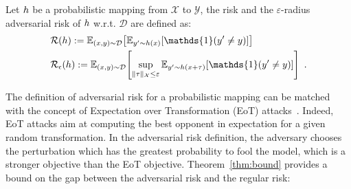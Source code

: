\begin{definition}
 Let $h$ be a probabilistic mapping from $\mathcal{X}$ to $\mathcal{Y}$, the risk and the $\varepsilon$-radius adversarial risk of $h$ w.r.t. $\mathcal{D}$ are defined as:
 \begin{align*}
&\risk(\probmap):= \mathbb{E}_{(x,y)\sim \mathcal{D}}\left[ \mathbb{E}_{y'\sim \probmap(x)} \left[ \mathds{1} \left( y' \neq y \right)\right]\right]\\
&\riskadv(\probmap):= \mathbb{E}_{(x,y)\sim \mathcal{D}}\left[ \sup_{\lVert{\tau}\rVert_{\mathcal{X}} \leq \varepsilon}\mathbb{E}_{y'\sim \probmap(x+\tau)} \left[ \mathds{1} \left( y' \neq y \right)\right]\right]\enspace.
\end{align*}




    
    
    

\end{definition}


The definition of adversarial risk for a probabilistic mapping can be matched with the concept of Expectation over Transformation (EoT) attacks~\citep{athalye2018obfuscated}. Indeed, EoT attacks aim at computing the best opponent in expectation for a given random transformation. In the adversarial risk definition, the adversary chooses the perturbation which has the greatest probability to fool the model, which is a stronger objective than the EoT objective. Theorem~\ref{thm:bound} provides a bound on the gap between the adversarial risk and the regular risk:

